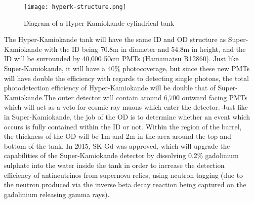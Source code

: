 \documentclass[11pt,oneside,a4paper]{article}
\begin{document}
\begin{figure}[htbp]
	\centering
	\texttt{[image: hyperk-structure.png]}
	\caption{Diagram of a Hyper-Kamiokande cylindrical tank}
	\label{fig:hyperk-structure}
\end{figure}

The Hyper-Kamiokande tank will have the same ID and OD structure as Super-Kamiokande with the ID being 70.8m in diameter and 54.8m in height, and the ID will be surrounded by 40,000 50cm PMTs (Hamamatsu R12860). Just like Super-Kamiokande, it will have a 40\% photocoverage, but since these new PMTs will have double the efficiency with regards to detecting single photons,  the total photodetection efficiency of Hyper-Kamiokande will be double that of Super-Kamiokande.The outer detector will contain around 6,700 outward facing PMTs which will act as a veto for cosmic ray muons which enter the detector. Just like in Super-Kamiokande, the job of the OD is to determine whether an event which occurs is fully contained within the ID or not. Within the region of the barrel, the thickness of the OD will be 1m and 2m in the area around the top and bottom of the tank. In 2015, SK-Gd was approved, which will upgrade the capabilities of the Super-Kamiokande detector by dissolving 0.2\% gadolinium sulphate into the water inside the tank in order to increase the detection efficiency of antineutrinos from supernova relics, using neutron tagging (due to the neutron produced via the inverse beta decay reaction being captured on the gadolinium releasing gamma rays). 
\end{document}
